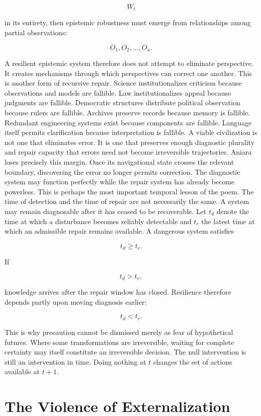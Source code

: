 \documentclass[11pt,oneside]{book}
\theoremstyle{definition}
\theoremstyle{remark}
\begin{document}
\[
W_t
\]

in its entirety, then epistemic robustness must emerge from relationships among partial
observations:

\[
O_1,O_2,\ldots,O_n.
\]

A resilient epistemic system therefore does not attempt to eliminate perspective. It creates
mechanisms through which perspectives can correct one another. This is another form of recursive
repair. Science institutionalizes criticism because observations and models are fallible. Law
institutionalizes appeal because judgments are fallible. Democratic structures distribute political
observation because rulers are fallible. Archives preserve records because memory is fallible.
Redundant engineering systems exist because components are fallible. Language itself permits
clarification because interpretation is fallible. A viable civilization is not one that eliminates
error. It is one that preserves enough diagnostic plurality and repair capacity that errors need not
become irreversible trajectories. Aniara loses precisely this margin. Once its navigational state
crosses the relevant boundary, discovering the error no longer permits correction. The diagnostic
system may function perfectly while the repair system has already become powerless. This is perhaps
the most important temporal lesson of the poem. The time of detection and the time of repair are not
necessarily the same. A system may remain diagnosable after it has ceased to be recoverable. Let
\(t_d\) denote the time at which a disturbance becomes reliably detectable and \(t_r\) the latest
time at which an admissible repair remains available. A dangerous system satisfies

\[
t_d\geq t_r.
\]

If

\[
t_d>t_r,
\]

knowledge arrives after the repair window has closed. Resilience therefore depends partly upon
moving diagnosis earlier:

\[
t_d<t_r.
\]

This is why precaution cannot be dismissed merely as fear of hypothetical futures. Where some
transformations are irreversible, waiting for complete certainty may itself constitute an
irreversible decision. The null intervention is still an intervention in time. Doing nothing at
\(t\) changes the set of actions available at \(t+1\).

\section*{The Violence of Externalization}
\end{document}
